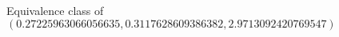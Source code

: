 \documentclass[preview]{standalone}
\begin{document}
\begin{center}
Equivalence class of $(0.27225963066056635, 0.3117628609386382, 2.9713092420769547)$
\end{center}
\end{document}
